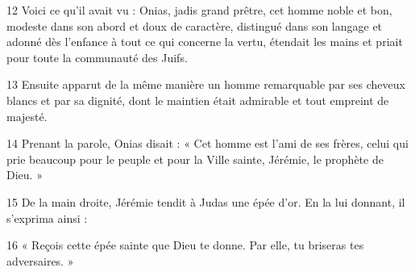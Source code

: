 
12 Voici ce qu’il avait vu : Onias, jadis grand prêtre, cet homme noble et bon, modeste dans son abord et doux de caractère, distingué dans son langage et adonné dès l’enfance à tout ce qui concerne la vertu, étendait les mains et priait pour toute la communauté des Juifs.

13 Ensuite apparut de la même manière un homme remarquable par ses cheveux blancs et par sa dignité, dont le maintien était admirable et tout empreint de majesté.

14 Prenant la parole, Onias disait : « Cet homme est l’ami de ses frères, celui qui prie beaucoup pour le peuple et pour la Ville sainte, Jérémie, le prophète de Dieu. »

15 De la main droite, Jérémie tendit à Judas une épée d’or. En la lui donnant, il s’exprima ainsi :

16 « Reçois cette épée sainte que Dieu te donne. Par elle, tu briseras tes adversaires. »
